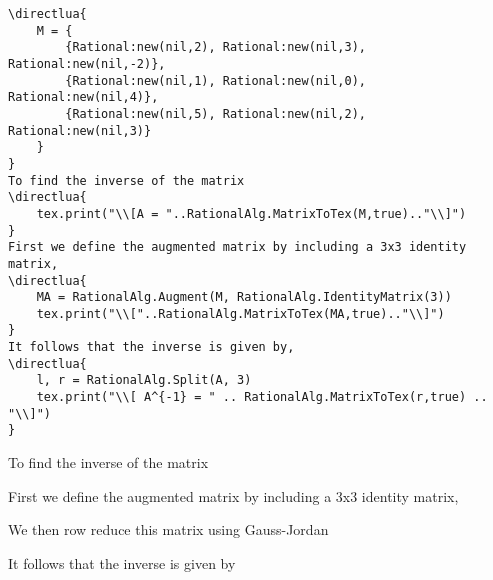 \documentclass[11pt]{article}
\begin{document}
\begin{lstlisting}
\directlua{
    M = {
        {Rational:new(nil,2), Rational:new(nil,3), Rational:new(nil,-2)},
        {Rational:new(nil,1), Rational:new(nil,0), Rational:new(nil,4)},
        {Rational:new(nil,5), Rational:new(nil,2), Rational:new(nil,3)}    
    }
}
To find the inverse of the matrix
\directlua{
    tex.print("\\[A = "..RationalAlg.MatrixToTex(M,true).."\\]")
}
First we define the augmented matrix by including a 3x3 identity matrix,
\directlua{
    MA = RationalAlg.Augment(M, RationalAlg.IdentityMatrix(3))
    tex.print("\\["..RationalAlg.MatrixToTex(MA,true).."\\]")
}
It follows that the inverse is given by,
\directlua{
    l, r = RationalAlg.Split(A, 3)
    tex.print("\\[ A^{-1} = " .. RationalAlg.MatrixToTex(r,true) .. "\\]")
}
\end{lstlisting}


To find the inverse of the matrix

First we define the augmented matrix by including a 3x3 identity matrix,


We then row reduce this matrix using Gauss-Jordan


It follows that the inverse is given by

\end{document}
